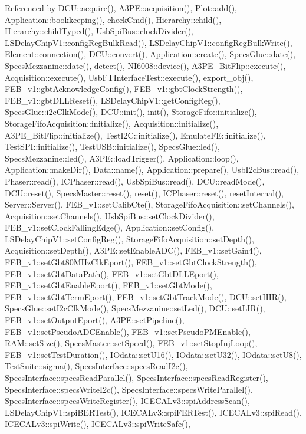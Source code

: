 Referenced by D\+C\+U\+::acquire(), A3\+P\+E\+::acquisition(), Plot\+::add(), Application\+::bookkeeping(), check\+Cmd(), Hierarchy\+::child(), Hierarchy\+::child\+Typed(), Usb\+Spi\+Bus\+::clock\+Divider(), L\+S\+Delay\+Chip\+V1\+::config\+Reg\+Bulk\+Read(), L\+S\+Delay\+Chip\+V1\+::config\+Reg\+Bulk\+Write(), Element\+::connection(), D\+C\+U\+::convert(), Application\+::create(), Specs\+Glue\+::date(), Specs\+Mezzanine\+::date(), detect(), N\+I6008\+::device(), A3\+P\+E\+\_\+\+Bit\+Flip\+::execute(), Acquisition\+::execute(), Usb\+F\+T\+Interface\+Test\+::execute(), export\+\_\+obj(), F\+E\+B\+\_\+v1\+::gbt\+Acknowledge\+Config(), F\+E\+B\+\_\+v1\+::gbt\+Clock\+Strength(), F\+E\+B\+\_\+v1\+::gbt\+D\+L\+L\+Reset(), L\+S\+Delay\+Chip\+V1\+::get\+Config\+Reg(), Specs\+Glue\+::i2c\+Clk\+Mode(), D\+C\+U\+::init(), init(), Storage\+Fifo\+::initialize(), Storage\+Fifo\+Acquisition\+::initialize(), Acquisition\+::initialize(), A3\+P\+E\+\_\+\+Bit\+Flip\+::initialize(), Test\+I2\+C\+::initialize(), Emulate\+F\+E\+::initialize(), Test\+S\+P\+I\+::initialize(), Test\+U\+S\+B\+::initialize(), Specs\+Glue\+::led(), Specs\+Mezzanine\+::led(), A3\+P\+E\+::load\+Trigger(), Application\+::loop(), Application\+::make\+Dir(), Data\+::name(), Application\+::prepare(), Usb\+I2c\+Bus\+::read(), Phaser\+::read(), I\+C\+Phaser\+::read(), Usb\+Spi\+Bus\+::read(), D\+C\+U\+::read\+Mode(), D\+C\+U\+::reset(), Specs\+Master\+::reset(), reset(), I\+C\+Phaser\+::reset(), reset\+Internal(), Server\+::\+Server(), F\+E\+B\+\_\+v1\+::set\+Calib\+Cte(), Storage\+Fifo\+Acquisition\+::set\+Channels(), Acquisition\+::set\+Channels(), Usb\+Spi\+Bus\+::set\+Clock\+Divider(), F\+E\+B\+\_\+v1\+::set\+Clock\+Falling\+Edge(), Application\+::set\+Config(), L\+S\+Delay\+Chip\+V1\+::set\+Config\+Reg(), Storage\+Fifo\+Acquisition\+::set\+Depth(), Acquisition\+::set\+Depth(), A3\+P\+E\+::set\+Enable\+A\+D\+C(), F\+E\+B\+\_\+v1\+::set\+Gain4(), F\+E\+B\+\_\+v1\+::set\+Gbt80\+M\+Hz\+Clk\+Eport(), F\+E\+B\+\_\+v1\+::set\+Gbt\+Clock\+Strength(), F\+E\+B\+\_\+v1\+::set\+Gbt\+Data\+Path(), F\+E\+B\+\_\+v1\+::set\+Gbt\+D\+L\+L\+Eport(), F\+E\+B\+\_\+v1\+::set\+Gbt\+Enable\+Eport(), F\+E\+B\+\_\+v1\+::set\+Gbt\+Mode(), F\+E\+B\+\_\+v1\+::set\+Gbt\+Term\+Eport(), F\+E\+B\+\_\+v1\+::set\+Gbt\+Track\+Mode(), D\+C\+U\+::set\+H\+I\+R(), Specs\+Glue\+::set\+I2c\+Clk\+Mode(), Specs\+Mezzanine\+::set\+Led(), D\+C\+U\+::set\+L\+I\+R(), F\+E\+B\+\_\+v1\+::set\+Output\+Eport(), A3\+P\+E\+::set\+Pipeline(), F\+E\+B\+\_\+v1\+::set\+Pseudo\+A\+D\+C\+Enable(), F\+E\+B\+\_\+v1\+::set\+Pseudo\+P\+M\+Enable(), R\+A\+M\+::set\+Size(), Specs\+Master\+::set\+Speed(), F\+E\+B\+\_\+v1\+::set\+Stop\+Inj\+Loop(), F\+E\+B\+\_\+v1\+::set\+Test\+Duration(), I\+Odata\+::set\+U16(), I\+Odata\+::set\+U32(), I\+Odata\+::set\+U8(), Test\+Suite\+::sigma(), Specs\+Interface\+::specs\+Read\+I2c(), Specs\+Interface\+::specs\+Read\+Parallel(), Specs\+Interface\+::specs\+Read\+Register(), Specs\+Interface\+::specs\+Write\+I2c(), Specs\+Interface\+::specs\+Write\+Parallel(), Specs\+Interface\+::specs\+Write\+Register(), I\+C\+E\+C\+A\+Lv3\+::spi\+Address\+Scan(), L\+S\+Delay\+Chip\+V1\+::spi\+B\+E\+R\+Test(), I\+C\+E\+C\+A\+Lv3\+::spi\+F\+E\+R\+Test(), I\+C\+E\+C\+A\+Lv3\+::spi\+Read(), I\+C\+E\+C\+A\+Lv3\+::spi\+Write(), I\+C\+E\+C\+A\+Lv3\+::spi\+Write\+Safe(), 